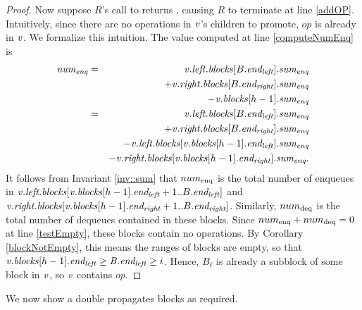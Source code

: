 \begin{proof}
Now suppose $R$'s call to  returns \nl, causing $R$ to terminate at line \ref{addOP}.
Intuitively, since there are no operations in $\var{v}$'s children to promote, $op$ is already in $\var{v}$.
We formalize this intuition.
The value computed at line \ref{computeNumEnq} is
\begin{eqnarray*}
\var{num\sub{enq}}
&=&  \var{v}.\fld{left.blocks}[B.\eleft].\fld{sum\sub{enq}} \\
&& + \var{v}.\fld{right.blocks}[B.\eright].\fld{sum\sub{enq}}\\
&&  - \var{v}.\fld{blocks}[h-1].\fld{sum\sub{enq}} \\
&=& \var{v}.\fld{left.blocks}[B.\eleft].\fld{sum\sub{enq}}\\
&& + \var{v}.\fld{right.blocks}[B.\eright].\fld{sum\sub{enq}} \\
&&- \var{v}.\fld{left.blocks}[\var{v}.\fld{blocks}[h-1].\eleft].\fld{sum\sub{enq}} \\
&& - \var{v}.\fld{right.blocks}[\var{v}.\fld{blocks}[h-1].\eright].\fld{sum\sub{enq}}.
\end{eqnarray*}
It follows from Invariant \ref{inv::sum} that $num\sub{enq}$ is the total  number of enqueues  in 
$\var{v}.\fld{left.blocks}[\var{v}.\fld{blocks}[h-1].\eleft+1..B.\eleft]$ and
$\var{v}.\fld{right.blocks}[\var{v}.\fld{blocks}[h-1].\eright+1..B.\eright]$.
Similarly, $num\sub{deq}$ is the total number of dequeues contained in these blocks.
Since $num\sub{enq}+num\sub{deq}=0$ at line \ref{testEmpty},
these blocks contain no operations.
By Corollary \ref{blockNotEmpty}, this means the ranges of blocks are empty, so that $\var{v}.\fld{blocks}[h-1].\eleft \geq \var{B}.\eleft \geq i$.
Hence, $B_\ell$ is already a subblock of some block in $\var{v}$, so $\var{v}$ contains $op$.
\end{proof}

We now show  a double  propagates blocks as required.

